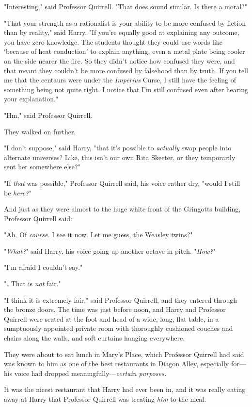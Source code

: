 "Interesting," said Professor Quirrell. "That does sound similar. Is there a 
moral?"

"That your strength as a rationalist is your ability to be more confused by 
fiction than by reality," said Harry. "If you're equally good at explaining any 
outcome, you have zero knowledge. The students thought they could use words 
like `because of heat conduction' to explain anything, even a metal plate being 
cooler on the side nearer the fire. So they didn't notice how confused they 
were, and that meant they couldn't be more confused by falsehood than by truth. 
If you tell me that the centaurs were under the \emph{Imperius} Curse, I still 
have the feeling of something being not quite right. I notice that I'm still 
confused even after hearing your explanation."

"Hm," said Professor Quirrell.

They walked on further.

"I don't suppose," said Harry, "that it's possible to \emph{actually} swap 
people into alternate universes? Like, this isn't our own Rita Skeeter, or they 
temporarily sent her somewhere else?"

"If \emph{that} was possible," Professor Quirrell said, his voice rather dry, 
"would I still be \emph{here?}"

And just as they were almost to the huge white front of the Gringotts building, 
Professor Quirrell said:

"Ah. Of \emph{course.} I see it now. Let me guess, the Weasley twins?"

"\emph{What?}" said Harry, his voice going up another octave in pitch. 
"\emph{How?}"

"I'm afraid I couldn't say."

"{\ldots}That is \emph{not} fair."

"I think it is extremely fair," said Professor Quirrell, and they entered 
through the bronze doors.
\sbreak
The time was just before noon, and Harry and Professor Quirrell were seated at 
the foot and head of a wide, long, flat table, in a sumptuously appointed 
private room with thoroughly cushioned couches and chairs along the walls, and 
soft curtains hanging everywhere.

They were about to eat lunch in Mary's Place, which Professor Quirrell had said 
was known to him as one of the best restaurants in Diagon Alley, especially 
for---his voice had dropped meaningfully---\emph{certain purposes.}

It was the nicest restaurant that Harry had ever been in, and it was really 
eating away at Harry that Professor Quirrell was treating \emph{him} to the 
meal.

